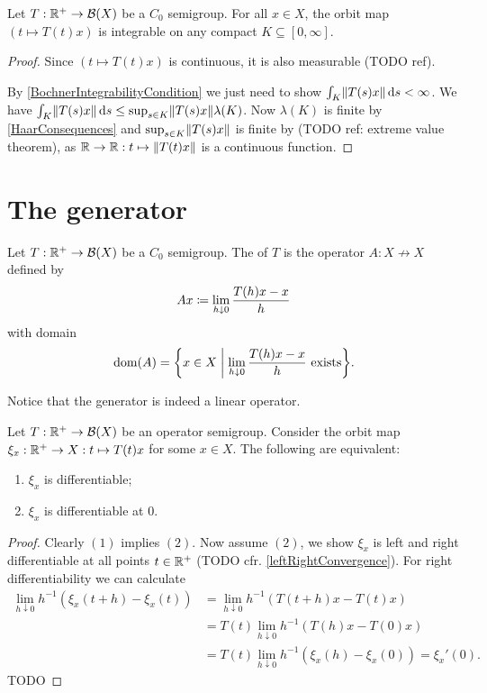 \begin{lemma} \label{integrabilityOrbitMaps}
Let $T: \mathbb{R}^+\to \operatorname{\mathcal{B}}(X)$ be a $C_0$ semigroup. For all $x\in X$, the orbit map $(t\mapsto T(t)x)$ is integrable on any compact $K\subseteq [0,\infty]$.
\end{lemma}
\begin{proof}
Since $(t\mapsto T(t)x)$ is continuous, it is also measurable (TODO ref).

By \ref{BochnerIntegrabilityCondition} we just need to show $\int_K\lVert T(s)x\rVert\operatorname{d \!}{s} < \infty$. We have $\int_K\lVert T(s)x\rVert\operatorname{d \!}{s} \leq \sup_{s\in K}\lVert T(s)x\rVert\lambda(K)$. Now $\lambda(K)$ is finite by \ref{HaarConsequences} and $\sup_{s\in K}\lVert T(s)x\rVert$ is finite by (TODO ref: extreme value theorem), as $\mathbb{R} \to \mathbb{R}: t\mapsto \lVert T(t)x\rVert$ is a continuous function.
\end{proof}



\section{The generator}
\begin{definition}
Let $T: \mathbb{R}^+\to \operatorname{\mathcal{B}}(X)$ be a $C_0$ semigroup. The  of $T$ is the operator $A: X\not\to X$ defined by
\[ Ax \coloneqq \lim_{h\downarrow 0}\frac{T(h)x - x}{h} \]
with domain
\[ \dom(A) = \setbuilder{x\in X}{\text{$\lim_{h\downarrow 0}\frac{T(h)x - x}{h}$ exists}}. \]
\end{definition}
Notice that the generator is indeed a linear operator.

\begin{lemma}
Let $T: \mathbb{R}^+\to \operatorname{\mathcal{B}}(X)$ be an operator semigroup. Consider the orbit map $\xi_x: \mathbb{R}^+ \to X: t\mapsto T(t)x$ for some $x\in X$. The following are equivalent:
\begin{enumerate}
\item $\xi_x$ is differentiable;
\item $\xi_x$ is differentiable at $0$.
\end{enumerate}
\end{lemma}
\begin{proof}
Clearly $(1)$ implies $(2)$. Now assume $(2)$, we show $\xi_x$ is left and right differentiable at all points $t\in\mathbb{R}^+$ (TODO cfr. \ref{leftRightConvergence}). For right differentiability we can calculate
\begin{align*}
\lim_{h\downarrow 0} h^{-1}(\xi_x(t+h) - \xi_x(t)) &= \lim_{h\downarrow 0} h^{-1}(T(t+h)x - T(t)x) \\
&= T(t)\lim_{h\downarrow 0} h^{-1}(T(h)x - T(0)x) \\
&= T(t)\lim_{h\downarrow 0} h^{-1}(\xi_x(h) - \xi_x(0)) = \xi_x'(0).
\end{align*}
TODO
\end{proof}

